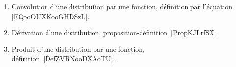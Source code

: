 
\begin{enumerate}
	\item
	      Convolution d'une distribution par une fonction, définition par l'équation \eqref{EQooOUXKooGHDSzL}.
	\item
	      Dérivation d'une distribution, proposition-définition~\ref{PropKJLrfSX}.
	\item
	      Produit d'une distribution par une fonction, définition~\ref{DefZVRNooDXAoTU}.
\end{enumerate}
